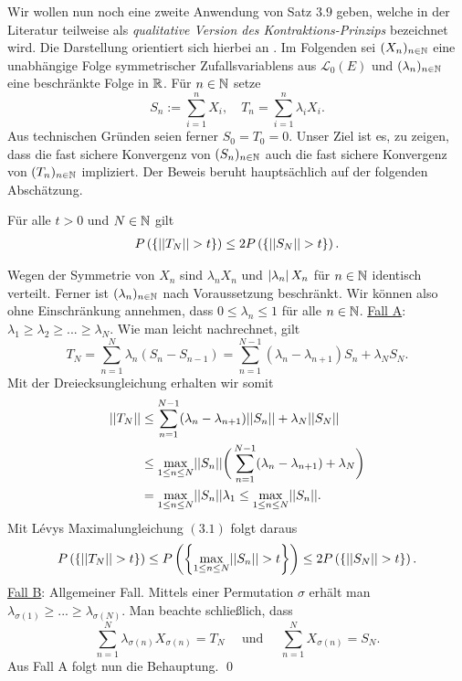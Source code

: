 Wir wollen nun noch eine zweite Anwendung von Satz $3.9$ geben, welche in der Literatur teilweise als \textit{qualitative Version des Kontraktions-Prinzips} bezeichnet wird. Die Darstellung orientiert sich hierbei an \cite{li-queffelec}. 
Im Folgenden sei $(X_n)_{n \in \mathbb{N}}$ eine unabhängige Folge symmetrischer Zufallsvariablens aus $\mathcal{L}_0(E)$ und $(\lambda_n)_{n \in \mathbb{N}}$ eine beschränkte Folge in $\mathbb{R}$. 
Für $n \in \mathbb{N}$ setze
$$
    S_n := \sum_{i=1}^nX_i, \quad T_n = \sum_{i=1}^n\lambda_iX_i. 
$$
Aus technischen Gründen seien ferner $S_0 = T_0 = 0$. 
Unser Ziel ist es, zu zeigen, dass die fast sichere Konvergenz von $(S_n)_{n \in \mathbb{N}}$ auch die fast sichere Konvergenz von $(T_n)_{n \in \mathbb{N}}$ impliziert. 
Der Beweis beruht hauptsächlich auf der folgenden Abschätzung. 
\begin{lemma}
    Für alle $t > 0$ und $N \in \mathbb{N}$ gilt
    \begin{align}
        P\left(\left\{ \lvert\lvert T_N \rvert\rvert > t \right\}\right) \leq 2 P\left(\left\{ \lvert\lvert S_N \rvert\rvert > t \right\}\right). 
    \end{align}
\end{lemma}

\begin{proof*}
    Wegen der Symmetrie von $X_n$ sind $\lambda_n X_n$ und $\left| \lambda_n \right|X_n$ für $n \in \mathbb{N}$ identisch verteilt. Ferner ist $(\lambda_n)_{n \in \mathbb{N}}$ nach Voraussetzung beschränkt. 
    Wir können also ohne Einschränkung annehmen, dass $0 \leq \lambda_n \leq 1$ für alle $n \in \mathbb{N}$. 
    \newline 
    \underline{Fall A}: $\lambda_1 \geq \lambda_2 \geq... \geq \lambda_N$. 
    \newline 
    Wie man leicht nachrechnet, gilt  
    $$
        T_N = \sum_{n=1}^N \lambda_n(S_n - S_{n-1}) = \sum_{n=1}^{N-1}(\lambda_n - \lambda_{n+1})S_n + \lambda_N S_N. 
    $$
    Mit der Dreiecksungleichung erhalten wir somit
    \begin{align*}
        \lvert\lvert T_N \rvert\rvert &\leq \sum_{n=1}^{N-1}(\lambda_n - \lambda_{n+1})\lvert\lvert S_n \rvert\rvert + \lambda_N \lvert\lvert S_N \rvert\rvert \\\
                   &\leq \max_{1 \leq n \leq N}\lvert\lvert S_n \rvert\rvert \bigg(\sum_{n=1}^{N-1}(\lambda_n - \lambda_{n+1}) + \lambda_N\bigg) \\\
                   &= \max_{1\leq n \leq N}\lvert\lvert S_n \rvert\rvert \lambda_1 \leq \max_{1\leq n \leq N}\lvert\lvert S_n \rvert\rvert.
    \end{align*}
    Mit Lévys Maximalungleichung $(3.1)$ folgt daraus
    $$
        P\left(\left\{ \lvert\lvert T_N \rvert\rvert > t \right\}\right) \leq P\left(\left\{ \max_{1 \leq n \leq N}\lvert\lvert S_n \rvert\rvert > t \right\}\right) \leq 2 P\left(\left\{ \lvert\lvert S_N \rvert\rvert > t \right\}\right).
    $$
    \underline{Fall B}: Allgemeiner Fall. 
    \newline 
    Mittels einer Permutation $\sigma$ erhält man $\lambda_{\sigma(1)} \geq ... \geq \lambda_{\sigma(N)}$. Man beachte schließlich, dass 
    $$
        \sum_{n=1}^N\lambda_{\sigma(n)}X_{\sigma(n)} = T_N \quad \text{ und } \quad \sum_{n=1}^N X_{\sigma(n)} = S_N.
    $$ 
    Aus Fall A folgt nun die Behauptung. \qed
\end{proof*}

